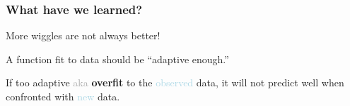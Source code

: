 \documentclass{beamer}
\newcommand{\bo}[1]{\textcolor{burntorange}{#1}}
\newcommand{\lb}[1]{\textcolor{lightblue}{#1}}
\newcommand{\dg}[1]{\textcolor{darkgray}{#1}}
\newcommand{\bb}{$\lb{{\small \bullet } }$ \hspace{0.5mm}}
\newcommand{\ba}{$\lb{{\small \rightarrow } }$ \hspace{0.5mm}}
\newcommand{\sk}{\vspace{.5cm}}
\newcommand{\sko}{\vspace{.1in}}
\newcommand{\skoo}{\vspace{.2in}}
\begin{document}
%
%
%
%
%
%
%
%
%
%
%	
%	


\begin{frame}
	\frametitle{What have we learned?}
	
	More \bo{wiggles} are not always better! \\ \sko \sko \sk
	
	A function fit to data should be ``adaptive enough.'' \\ \sko \sko \sk
	
	If too adaptive \dg{aka} \textbf{overfit} to the \lb{observed} data, it will not predict well when confronted with \lb{new} data.
	
	
	
\end{frame}
\end{document}
